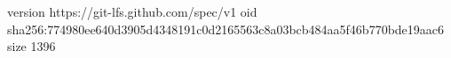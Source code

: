 version https://git-lfs.github.com/spec/v1
oid sha256:774980ee640d3905d4348191c0d2165563c8a03bcb484aa5f46b770bde19aac6
size 1396
